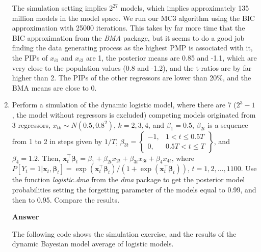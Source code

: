 \begin{enumerate}[leftmargin=*]
The simulation setting implies $2^{27}$ models, which implies approximately 135 million models in the model space. We run our MC3 algorithm using the BIC approximation with 25000 iterations. This takes by far more time that the BIC approximation from the \textit{BMA} package, but it seems to do a good job finding the data generating process as the highest PMP is associated with it, the PIPs of $x_{i1}$ and $x_{i2}$ are 1, the posterior means are 0.85 and -1.1, which are very close to the population values (0.8 and -1.2), and the t-ratios are by far higher than 2. The PIPs of the other regressors are lower than 20\%, and the BMA means are close to 0.

\item Perform a simulation of the dynamic logistic model, where there are 7 ($2^3-1$, the model without regressors is excluded) competing models originated from 3 regressors, $x_{tk}\sim N(0.5,0.8^2)$, $k=2,3,4$, and $\beta_1=0.5$, $\beta_{2t}$ is a sequence from 1 to 2 in steps given by $1/T$, $\beta_{3t}=\begin{Bmatrix}
	-1, & 1<t\leq 0.5T\\
	0, & 0.5T< t \leq T
\end{Bmatrix}$, and $\beta_4=1.2$. Then, $\bm{x}_t^{\top}\bm{\beta}_t=\beta_1+\beta_{2t}x_{2t}+\beta_{3t}x_{3t}+\beta_{4}x_{4t}$, where $P[Y_t=1|\bm{x}_t,\bm{\beta}_t]=\exp(\bm{x}_t^{\top}\bm{\beta}_t)/(1+\exp(\bm{x}_t^{\top}\bm{\beta}_t))$, $t=1,2,\dots,1100$. Use the function \textit{logistic.dma} from the \textit{dma} package to get the posterior model probabilities setting the forgetting parameter of the models equal to 0.99, and then to 0.95. Compare the results. 

\textbf{Answer}

The following code shows the simulation exercise, and the results of the dynamic Bayesian model average of logistic models.


\end{enumerate}
